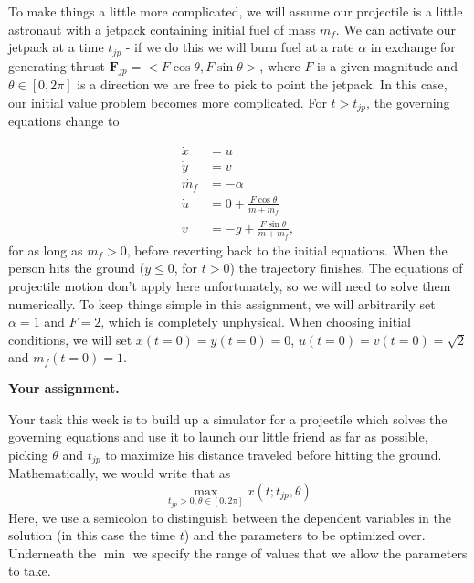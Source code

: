 \documentclass[12pt]{article}
\begin{document}
To make things a little more complicated, we will assume our projectile is a little astronaut with a jetpack containing initial fuel of mass $m_f$. We can activate our jetpack at a time $t_{jp}$ - if we do this we will burn fuel at a rate $\alpha$ in exchange for generating thrust $\mathbf{F}_{jp} = <F \cos \theta,F \sin \theta>$, where $F$ is a given magnitude and $\theta \in [0,2\pi]$ is a direction we are free to pick to point the jetpack. In this case, our initial value problem becomes more complicated. For $t > t_{jp}$, the governing equations change to

\begin{align}\label{projectile}
    \dot{x} &= u\\
    \dot{y} &= v\\
    \dot{m_f} &= -\alpha\\
    \dot{u} &= 0 + \frac{F \cos \theta}{m+m_f}\\
    \dot{v} &= -g + \frac{F \sin \theta}{m+m_f},
\end{align}
for as long as $m_f>0$, before reverting back to the initial equations. When the person hits the ground ($y\leq0$, for $t>0$) the trajectory finishes. The equations of projectile motion don't apply here unfortunately, so we will need to solve them numerically. To keep things simple in this assignment, we will arbitrarily set  $\alpha = 1$ and $F = 2$, which is completely unphysical. When choosing initial conditions, we will set $x(t=0)=y(t=0)=0$, $u(t=0) = v(t=0) = \sqrt{2}$ and $m_f(t=0) = 1$.
\vspace{5pt}


\noindent \textbf{Your assignment.}

Your task this week is to build up a simulator for a projectile which solves the governing equations and use it to launch our little friend as far as possible, picking $\theta$ and $t_{jp}$ to maximize his distance traveled before hitting the ground. Mathematically, we would write that as
\begin{equation}
    \underset{t_{jp}>0,\theta \in [0,2\pi]} \max x \left(t;t_{jp},\theta\right)
\end{equation}
Here, we use a semicolon to distinguish between the dependent variables in the solution (in this case the time $t$) and the parameters to be optimized over. Underneath the $\min$ we specify the range of values that we allow the parameters to take.

\vspace{5pt}
\end{document}
